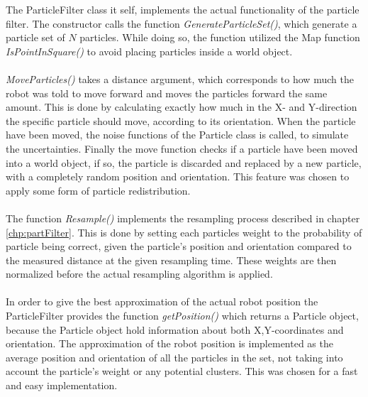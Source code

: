 \noindent The ParticleFilter class it self, implements the actual functionality of the particle filter.
The constructor calls the function \emph{GenerateParticleSet()}, which generate a particle set of $N$ particles. While doing so, the function utilized the Map function \emph{IsPointInSquare()} to avoid placing particles inside a world object.\\\\
%
\emph{MoveParticles()} takes a distance argument, which corresponds to how much the robot was told to move forward and moves the particles forward the same amount.
This is done by calculating exactly how much in the X- and Y-direction the specific particle should move, according to its orientation.
When the particle have been moved, the noise functions of the Particle class is called, to simulate the uncertainties.
Finally the move function checks if a particle have been moved into a world object, if so, the particle is discarded and replaced by a new particle, with a completely random position and orientation.
This feature was chosen to apply some form of particle redistribution.\\\\
%
The function \emph{Resample()} implements the resampling process described in chapter \ref{chp:partFilter}.
This is done by setting each particles weight to the probability of particle being correct, given the particle's position and orientation compared to the measured distance at the given resampling time.
These weights are then normalized before the actual resampling algorithm is applied.\\\\
%
In order to give the best approximation of the actual robot position the ParticleFilter provides the function \emph{getPosition()} which returns a Particle object, because the Particle object hold information about both X,Y-coordinates and orientation.
The approximation of the robot position is implemented as the average position and orientation of all the particles in the set, not taking into account the particle's weight or any potential clusters.
This was chosen for a fast and easy implementation.

  


\newpage
